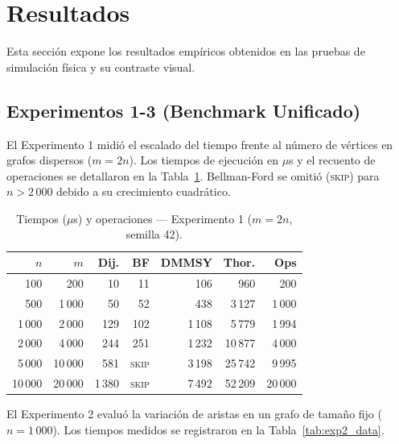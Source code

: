 \documentclass[conference]{IEEEtran}
\begin{document}
\section{Resultados}

Esta sección expone los resultados empíricos obtenidos en las pruebas de simulación física y su contraste visual.

\subsection{Experimentos 1-3 (Benchmark Unificado)}

El Experimento 1 midió el escalado del tiempo frente al número de vértices en grafos dispersos ($m=2n$). Los tiempos de ejecución en $\mu$s y el recuento de operaciones se detallaron en la Tabla~\ref{tab:exp1_data}. Bellman-Ford se omitió (\textsc{skip}) para $n > 2\,000$ debido a su crecimiento cuadrático.

\begin{table}[H]
  \centering
  \caption{Tiempos ($\mu$s) y operaciones — Experimento 1 ($m=2n$, semilla 42).}
  \label{tab:exp1_data}
  \scriptsize
  \begin{tabular}{rrrrrrr}
    \toprule
    $n$ & $m$ &
    \textbf{Dij.} & \textbf{BF} &
    \textbf{DMMSY} & \textbf{Thor.} &
    \textbf{Ops} \\
    \midrule
    100    & 200     & 10    & 11   & 106   & 960    & 200   \\
    500    & 1\,000  & 50    & 52   & 438   & 3\,127 & 1\,000 \\
    1\,000 & 2\,000  & 129   & 102  & 1\,108 & 5\,779 & 1\,994 \\
    2\,000 & 4\,000  & 244   & 251  & 1\,232 & 10\,877 & 4\,000 \\
    5\,000 & 10\,000 & 581   & \textsc{skip} & 3\,198 & 25\,742 & 9\,995 \\
    10\,000 & 20\,000 & 1\,380 & \textsc{skip} & 7\,492 & 52\,209 & 20\,000 \\
    \bottomrule
  \end{tabular}
\end{table}

El Experimento 2 evaluó la variación de aristas en un grafo de tamaño fijo ($n=1\,000$). Los tiempos medidos se registraron en la Tabla~\ref{tab:exp2_data}.
\end{document}
